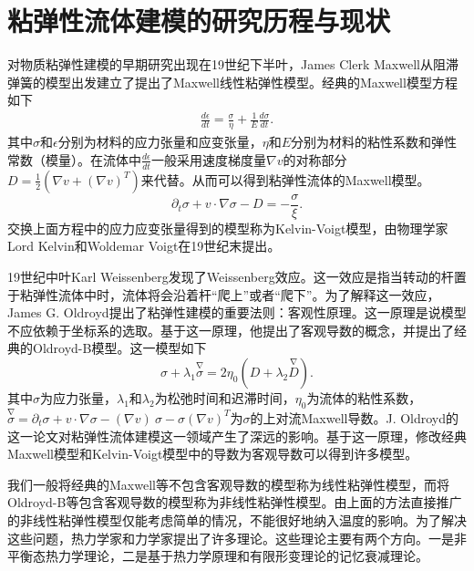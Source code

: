 \section{粘弹性流体建模的研究历程与现状}
对物质粘弹性建模的早期研究出现在19世纪下半叶，James Clerk Maxwell从阻滞弹簧的模型出发建立了提出了Maxwell线性粘弹性模型\cite{maxwell2013scientific}。经典的Maxwell模型方程如下
\begin{eqnarray*}
\frac {d\epsilon} {dt} = \frac {\sigma} {\eta} + \frac {1} {E} \frac {d\sigma} {dt}.
\end{eqnarray*}
其中$\sigma$和$\epsilon$分别为材料的应力张量和应变张量，$\eta$和$E$分别为材料的粘性系数和弹性常数（模量）。在流体中$\frac {d\epsilon} {dt}$一般采用速度梯度量$\nabla v$的对称部分$D=\frac{1}{2} (\nabla v + (\nabla v)^T)$来代替。从而可以得到粘弹性流体的Maxwell模型。
\begin{equation} \label{eq:maxwell}
			\partial_t \sigma + v \cdot \nabla \sigma - D = -\frac{\sigma}{\xi}. 
\end{equation}
交换上面方程中的应力应变张量得到的模型称为Kelvin-Voigt模型，由物理学家Lord Kelvin和Woldemar Voigt在19世纪末提出\cite{kelvin1887stability}。

19世纪中叶Karl Weissenberg发现了Weissenberg效应。这一效应是指当转动的杆置于粘弹性流体中时，流体将会沿着杆“爬上”或者“爬下”\cite{weissenberg1947continuum}。为了解释这一效应，James G. Oldroyd提出了粘弹性建模的重要法则：客观性原理。这一原理是说模型不应依赖于坐标系的选取。基于这一原理，他提出了客观导数的概念，并提出了经典的Oldroyd-B模型。这一模型如下
\begin{equation} \label{eq:Oldroyd}
	{\sigma} + \lambda_1 \stackrel{\nabla}{{\sigma}} = 2\eta_0 ({D} + \lambda_2 \stackrel{\nabla}{{D}}).
\end{equation}
其中$\sigma$为应力张量，$\lambda_1$和$\lambda_2$为松弛时间和迟滞时间，$\eta_0$为流体的粘性系数，${\stackrel{\nabla} \sigma}= \partial_t \sigma + v \cdot \nabla \sigma - (\nabla v)\  \sigma - \sigma (\nabla v)^T$为$\sigma$的上对流Maxwell导数\cite{oldroyd1950formulation}。J. Oldroyd的这一论文对粘弹性流体建模这一领域产生了深远的影响。基于这一原理，修改经典Maxwell模型和Kelvin-Voigt模型中的导数为客观导数可以得到许多模型\cite{lin2005hydrodynamics,larson1999structure}。

我们一般将经典的Maxwell等不包含客观导数的模型称为线性粘弹性模型，而将Oldroyd-B等包含客观导数的模型称为非线性粘弹性模型。由上面的方法直接推广的非线性粘弹性模型仅能考虑简单的情况，不能很好地纳入温度的影响。为了解决这些问题，热力学家和力学家提出了许多理论。这些理论主要有两个方向。一是非平衡态热力学理论\cite{jou1996extended,ottinger2005beyond,zhu2014conservation}，二是基于热力学原理和有限形变理论的记忆衰减理论\cite{coleman1961foundations,truesdell2012rational}。


